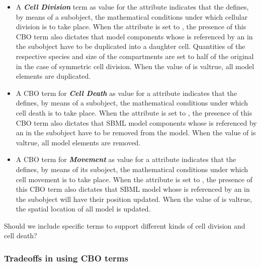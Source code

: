 \begin{itemize}
	\item A \textbf{\textit{Cell Division}} term as value for the  attribute indicates that the \Event defines, by means of a \Trigger subobject, the mathematical conditions under which cellular division is to take place. When the  \Event attribute is set to , the presence of this CBO term also dictates that model components whose  is referenced by an \Element in the \ListOfElements subobject have to be duplicated into a daughter cell. Quantities of the respective species and size of the compartments are set to half of the original in the case of symmetric cell division. When the value of  is val{true}, all model elements are duplicated. 
	
	\item A CBO term for \textbf{\textit{Cell Death}} as value for a  attribute indicates that the \Event defines, by means of a \Trigger subobject, the mathematical conditions under which cell death is to take place. When the  \Event attribute is set to , the presence of this CBO term also dictates that SBML model components whose  is referenced by an \Element in the \ListOfElements subobject have to be removed from the model. When the value of  is val{true}, all model elements are removed. 	
	
	\item A CBO term for \textbf{\textit{Movement}} as value for a  attribute indicates that the \Event defines, by means of its \Trigger suboject, the mathematical conditions under which cell movement is to take place. When the  \Event attribute is set to , the presence of this CBO term also dictates that SBML model \Compartments whose  is referenced by an \Element in the \ListOfElements subobject will have their position updated. When the value of  is val{true}, the spatial location of all model \Compartments is updated. 	

\end{itemize}

{\color{red} Should we include specific terms to support different kinds of cell division and cell death?}

\subsubsection{Tradeoffs in using CBO terms}
\label{subsec:tradeoffCBO}

